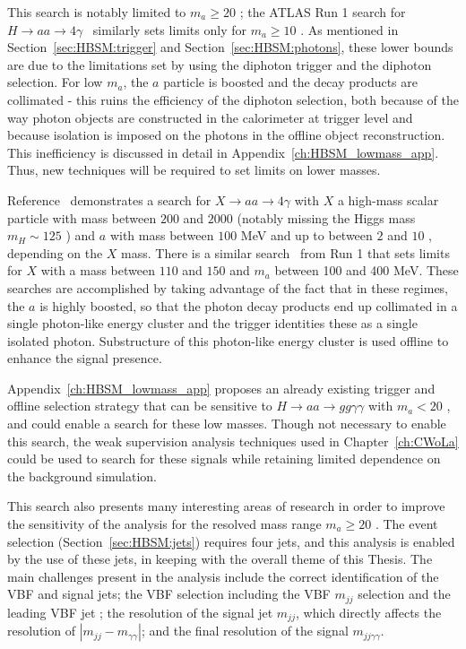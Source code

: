 This search is notably limited to $m_a\ge20$ \GeV{}; the ATLAS Run 1 search for $H\rightarrow aa \to 4\gamma$~\cite{Aad:2015bua} similarly sets limits only for $m_a\ge10$ \GeV{}.
As mentioned in Section~\ref{sec:HBSM:trigger} and Section~\ref{sec:HBSM:photons}, these lower bounds are due to the limitations set by using the diphoton trigger and the diphoton selection.
For low $m_a$, the $a$ particle is boosted and the decay products are collimated - this ruins the efficiency of the diphoton selection, both because of the way photon objects are constructed in the calorimeter at trigger level and because isolation is imposed on the photons in the offline object reconstruction.
This inefficiency is discussed in detail in Appendix~\ref{ch:HBSM_lowmass_app}.
Thus, new techniques will be required to set limits on lower masses.

Reference~\cite{Aaboud:2018djx} demonstrates a search for $X\rightarrow aa\rightarrow 4\gamma$ with $X$ a high-mass scalar particle with mass between $200$ and $2000$ \GeV{} (notably missing the Higgs mass $m_H\sim 125$ \GeV{}) and $a$ with mass between $100$ MeV and up to between $2$ and $10$ \GeV{}, depending on the $X$ mass.
There is a similar search~\cite{ATLAS-CONF-2012-079} from Run 1 that sets limits for $X$ with a mass between $110$ and $150$ \GeV{} and $m_a$ between 100 and 400 MeV.
These searches are accomplished by taking advantage of the fact that in these regimes, the $a$ is highly boosted, so that the photon decay products end up collimated in a single photon-like energy cluster and the trigger identities these as a single isolated photon.
Substructure of this photon-like energy cluster is used offline to enhance the signal presence.

Appendix~\ref{ch:HBSM_lowmass_app} proposes an already existing trigger and offline selection strategy that can be sensitive to $H\rightarrow aa\rightarrow gg\gamma\gamma$ with $m_a<20$ \GeV{}, and could enable a search for these low masses.
Though not necessary to enable this search, the weak supervision analysis techniques used in Chapter~\ref{ch:CWoLa} could be used to search for these signals while retaining limited dependence on the background simulation.


This search also presents many interesting areas of research in order to improve the sensitivity of the analysis for the resolved mass range $m_a\ge 20$ \GeV{}.
The event selection (Section~\ref{sec:HBSM:jets}) requires four jets, and this analysis is enabled by the use of these jets, in keeping with the overall theme of this Thesis.
The main challenges present in the analysis include the correct identification of the VBF and signal jets; the VBF selection including the VBF $m_{jj}$ selection and the leading VBF jet \pt{}; the resolution of the signal jet $m_{jj}$, which directly affects the resolution of $|m_{jj}-m_{\gamma\gamma}|$; and the final resolution of the signal $m_{jj\gamma\gamma}$.

